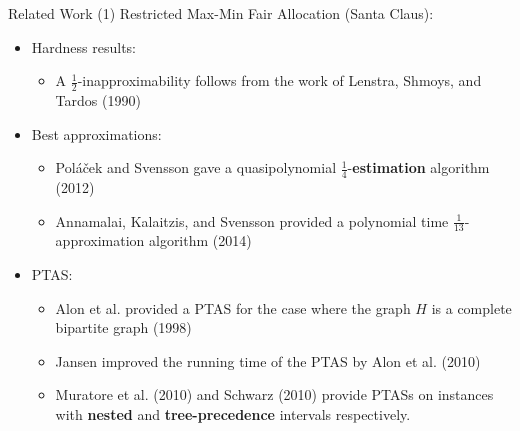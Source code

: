 \begin{frame}[t]{Related Work (1)}
	Restricted Max-Min Fair Allocation (Santa Claus):
	    \begin{itemize}
	    	\item<2-> Hardness results:
                \begin{itemize}
            	    \item<3-> A $\frac{1}{2}$-inapproximability follows from the work of Lenstra, Shmoys, and Tardos (1990)
		        \end{itemize}
            \item<4-> Best approximations:
                \begin{itemize}
                    \item<5-> Pol\'{a}\v{c}ek and Svensson gave a quasipolynomial $\frac{1}{4}$-\textbf{estimation} algorithm (2012)
                    \item<6-> Annamalai, Kalaitzis, and Svensson provided a polynomial time $\frac{1}{13}$-approximation algorithm (2014)
                \end{itemize}
            \item<7-> PTAS:
                \begin{itemize}
                    \item<8-> Alon et al. provided a PTAS for the case where the graph $H$ is a complete bipartite graph (1998)
                    \item<9-> Jansen improved the running time of the PTAS by Alon et al. (2010)
                    \item<11-> Muratore et al. (2010) and Schwarz (2010) provide PTASs on instances with \textbf{nested} and \textbf{tree-precedence} intervals respectively.
                \end{itemize}
	       \end{itemize}
\end{frame}

